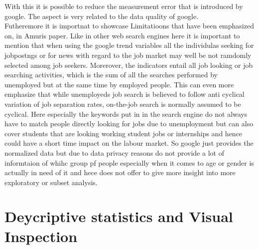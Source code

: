 \documentclass[12pt,a4paper]{article}
\begin{document}
With this it is possible to reduce the measurement error that is introduced by google.
The aspect is very related to the data quality of google.\\
Futheremore it is importnat to showcase Limitatioons that have been emphasized on, in Amuris paper. 
Like in other web search engines here it is important to mention that when using the google trend variables all the individulas seeking for jobpostngs or for news with regard to the job market may well be not ramdomly selected among job seekers.
Morerover, the indicators entail all job looking or job searching activities, which is the sum of all the searches performed by unemployed but at the same time by employed people. This can even more emphasize that while unemployeds job search is believed to follow anti cyclical variation of job separation rates, on-the-job search is normally assumed to be cyclical.
Here especially the keywords put in in the search engine do not always have to match people directly looking for jobs due to unemployment but can also cover students that are looking working student jobs or internships and hence could have a short time impact on the labour market. So google just provides the normalized data but due to data privacy reasons do not provide a lot of informtaion of whihc group pf people especially when it comes to age or gender is actually in need of it and hece does not offer to give more insight into more exploratory or subset analysis.





\section{Deycriptive statistics and Visual Inspection}
\end{document}
